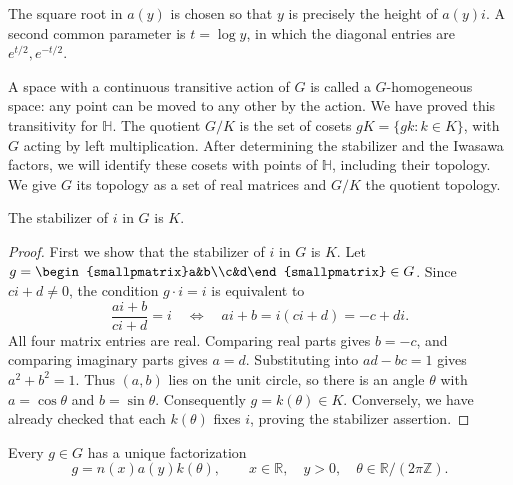 The square root in $a(y)$ is chosen so that $y$ is precisely the height of $a(y)i$. A second common parameter is $t=\log y$, in which the diagonal entries are $e^{t/2},e^{-t/2}$.

\label{hyperbolic.homogeneous-space}
A space with a continuous transitive action of $G$ is called a $G$-homogeneous space: any point can be moved to any other by the action. We have proved this transitivity for $\mathbb H$. The quotient $G/K$ is the set of cosets $gK=\{gk:k\in K\}$, with $G$ acting by left multiplication. After determining the stabilizer and the Iwasawa factors, we will identify these cosets with points of $\mathbb H$, including their topology. We give $G$ its topology as a set of real matrices and $G/K$ the quotient topology.

\begin{proposition}\label{hyperbolic.stabilizer}
The stabilizer of $i$ in $G$ is $K$.
\end{proposition}

\begin{proof}
First we show that the stabilizer of $i$ in $G$ is $K$. Let $g=\begin{smallpmatrix}a&b\\c&d\end{smallpmatrix}\in G$. Since $ci+d\ne0$, the condition $g\cdot i=i$ is equivalent to
\[
 \frac{ai+b}{ci+d}=i
 \quad\Longleftrightarrow\quad
 ai+b=i(ci+d)=-c+di.
\]
All four matrix entries are real. Comparing real parts gives $b=-c$, and comparing imaginary parts gives $a=d$. Substituting into $ad-bc=1$ gives $a^2+b^2=1$. Thus $(a,b)$ lies on the unit circle, so there is an angle $\theta$ with $a=\cos\theta$ and $b=\sin\theta$. Consequently $g=k(\theta)\in K$. Conversely, we have already checked that each $k(\theta)$ fixes $i$, proving the stabilizer assertion.
\end{proof}

\begin{theorem}\label{hyperbolic.iwasawa}
Every $g\in G$ has a unique factorization
\[
 g=n(x)a(y)k(\theta),\qquad x\in\mathbb R,\quad y>0,\quad \theta\in\mathbb R/(2\pi\mathbb Z).
\]
\end{theorem}

